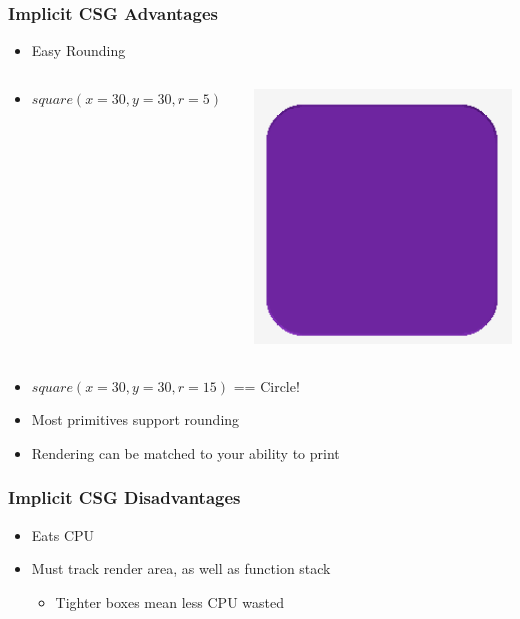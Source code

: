 \documentclass{beamer}
\begin{document}
\begin{frame}
\frametitle{Implicit CSG Advantages}
\begin{itemize}
\item Easy Rounding
\end{itemize}
\begin{columns}
  \begin{column}{0.75\textwidth}
    \begin{itemize}
    \item $square (x=30,y=30,r=5)$
    \end{itemize}
  \end{column}
  \begin{column}{0.25\textwidth}
    \includegraphics[width=1.0\textwidth, right]{website-rounded_square.png}
  \end{column}
\end{columns}
\begin{itemize}
\item $square (x=30,y=30,r=15)$ == Circle!
\item Most primitives support rounding
\item Rendering can be matched to your ability to print
\end{itemize}
\end{frame}

\begin{frame}[fragile]
\frametitle{Implicit CSG Disadvantages}
\begin{itemize}
\item Eats CPU
\item Must track render area, as well as function stack
  \begin{itemize}
  \item Tighter boxes mean less CPU wasted
  \end{itemize}
\end{itemize}
\end{frame}
\end{document}
